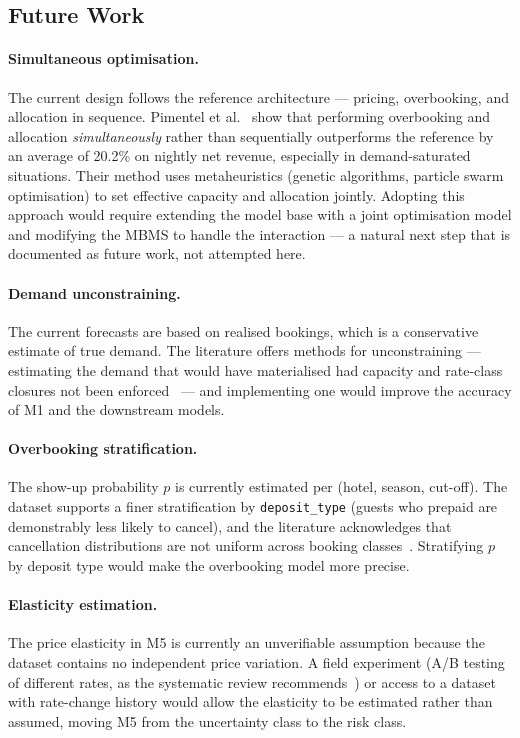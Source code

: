 \subsection{Future Work}

\paragraph{Simultaneous optimisation.}
The current design follows the reference architecture --- pricing, overbooking, and allocation in sequence. Pimentel et al.~\cite{pimentel2019} show that performing overbooking and allocation \emph{simultaneously} rather than sequentially outperforms the reference by an average of 20.2\% on nightly net revenue, especially in demand-saturated situations. Their method uses metaheuristics (genetic algorithms, particle swarm optimisation) to set effective capacity and allocation jointly. Adopting this approach would require extending the model base with a joint optimisation model and modifying the MBMS to handle the interaction --- a natural next step that is documented as future work, not attempted here.

\paragraph{Demand unconstraining.}
The current forecasts are based on realised bookings, which is a conservative estimate of true demand. The literature offers methods for unconstraining --- estimating the demand that would have materialised had capacity and rate-class closures not been enforced~\cite{pimentel2019} --- and implementing one would improve the accuracy of M1 and the downstream models.

\paragraph{Overbooking stratification.}
The show-up probability $p$ is currently estimated per (hotel, season, cut-off). The dataset supports a finer stratification by \texttt{deposit\_type} (guests who prepaid are demonstrably less likely to cancel), and the literature acknowledges that cancellation distributions are not uniform across booking classes~\cite{pimentel2019}. Stratifying $p$ by deposit type would make the overbooking model more precise.

\paragraph{Elasticity estimation.}
The price elasticity in M5 is currently an unverifiable assumption because the dataset contains no independent price variation. A field experiment (A/B testing of different rates, as the systematic review recommends~\cite{jawabreh2026}) or access to a dataset with rate-change history would allow the elasticity to be estimated rather than assumed, moving M5 from the uncertainty class to the risk class.


